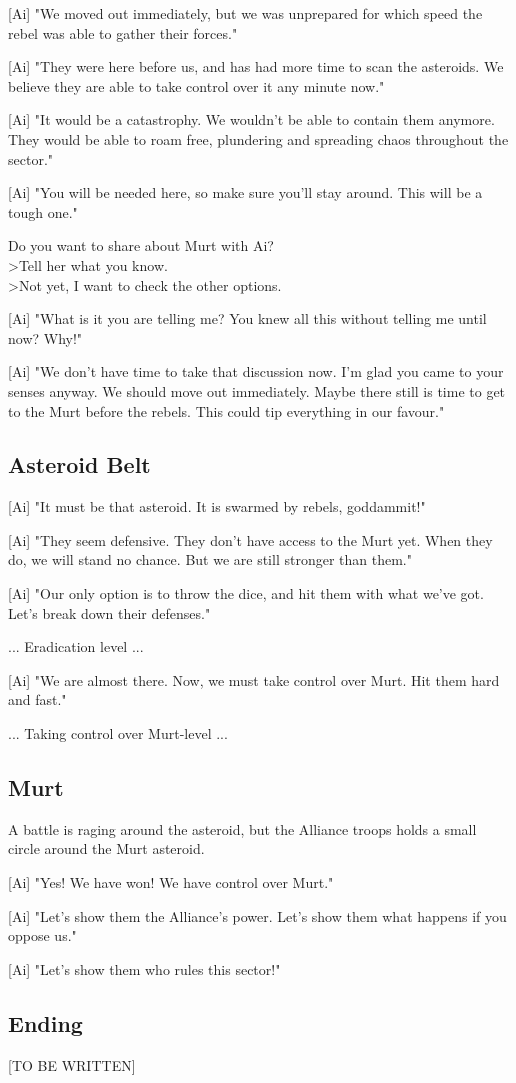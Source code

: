 \documentclass[a4paper,12pt]{article}
\begin{document}
[Ai] "We moved out immediately, but we was unprepared for which speed the rebel was able to gather their forces."

[Ai] "They were here before us, and has had more time to scan the asteroids. We believe they are able to take control
over it any minute now."

[Ai] "It would be a catastrophy. We wouldn't be able to contain them anymore. They would be able to roam free,
plundering and spreading chaos throughout the sector."

[Ai] "You will be needed here, so make sure you'll stay around. This will be a tough one."

Do you want to share about Murt with Ai?\\
\textgreater Tell her what you know.\\
\textgreater Not yet, I want to check the other options.

[Ai] "What is it you are telling me? You knew all this without telling me until now? Why!"

[Ai] "We don't have time to take that discussion now. I'm glad you came to your senses anyway. We should move out
immediately. Maybe there still is time to get to the Murt before the rebels. This could tip everything in our favour."

\subsection{Asteroid Belt}

[Ai] "It must be that asteroid. It is swarmed by rebels, goddammit!"

[Ai] "They seem defensive. They don't have access to the Murt yet. When they do, we will stand no chance.
But we are still stronger than them."

[Ai] "Our only option is to throw the dice, and hit them with what we've got. Let's break down their defenses."

... Eradication level ...

[Ai] "We are almost there. Now, we must take control over Murt. Hit them hard and fast."

... Taking control over Murt-level ...

\subsection{Murt}

A battle is raging around the asteroid, but the Alliance troops holds a small circle around the Murt asteroid.

[Ai] "Yes! We have won! We have control over Murt."

[Ai] "Let's show them the Alliance's power. Let's show them what happens if you oppose us."

[Ai] "Let's show them who rules this sector!"

\subsection{Ending}

[TO BE WRITTEN]
\end{document}
